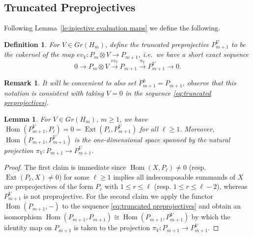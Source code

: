 \documentclass{amsart}
\newtheorem{definition}[theorem]{Definition}
\newtheorem{lemma}[theorem]{Lemma}
\newtheorem{remark}[theorem]{Remark}
\newcommand{\Ext}{\operatorname{Ext}}
\newcommand{\Hom}{\operatorname{Hom}}
\begin{document}
\subsection{Truncated Preprojectives}
\label{sec:truncated preprojectives}
Following Lemma~\ref{le:injective evaluation maps} we define the following.
\begin{definition}
  For $V\in Gr(H_m)$, define the \emph{truncated preprojective} $P_{m+1}^V$ to be the cokernel of the map $ev_V:P_m\otimes V\to P_{m+1}$, i.e.\ we have a short exact sequence
  \begin{equation}
    \label{eq:truncated preprojectives}
    0\longrightarrow P_m\otimes V\stackrel{ev_V}{\longrightarrow} P_{m+1}\stackrel{\pi_V}{\longrightarrow} P_{m+1}^V\longrightarrow 0.
  \end{equation}
\end{definition}
\begin{remark}
  It will be convenient to also set $P_{m+1}^0=P_{m+1}$, observe that this notation is consistent with taking $V=0$ in the sequence \eqref{eq:truncated preprojectives}.
\end{remark}

\begin{lemma}
  \label{le:basic homological properties}
  For $V\in Gr(H_m)$, $m\ge1$, we have $\Hom(P_{m+1}^V,P_\ell)=0=\Ext(P_\ell,P_{m+1}^V)$ for all $\ell\ge1$.
  Moreover, $\Hom(P_{m+1},P_{m+1}^V)$ is the one-dimensional space spanned by the natural projection $\pi_V:P_{m+1}\to P_{m+1}^V$.
\end{lemma}
\begin{proof}
  The first claim is immediate since $\Hom(X,P_\ell)\ne0$ (resp. $\Ext(P_\ell,X)\ne0$) for some $\ell\ge1$ implies all indecomposable summands of $X$ are preprojectives of the form $P_r$ with $1\le r\le\ell$ (resp. $1\le r\le\ell-2$), whereas $P_{m+1}^V$ is not preprojective.
  For the second claim we apply the functor $\Hom(P_{m+1},-)$ to the sequence \eqref{eq:truncated preprojectives} and obtain an isomorphism $\Hom(P_{m+1},P_{m+1})\cong\Hom(P_{m+1},P_{m+1}^V)$ by which the identity map on $P_{m+1}$ is taken to the projection $\pi_V:P_{m+1}\to P_{m+1}^V$.
\end{proof}
\end{document}
